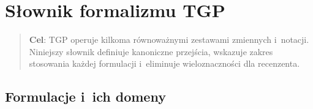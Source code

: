 \section{Słownik formalizmu TGP}\label{app:formulation-dictionary}

\begin{quote}
\textbf{Cel}: TGP operuje kilkoma równoważnymi zestawami zmiennych
i~notacji. Niniejszy słownik definiuje kanoniczne przejścia,
wskazuje zakres stosowania każdej formulacji i~eliminuje
wieloznaczności dla recenzenta.
\end{quote}

\subsection{Formulacje i~ich domeny}

